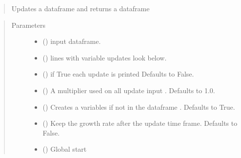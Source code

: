 \documentclass[letterpaper,10pt,english]{sphinxmanual}
\begin{document}
\begin{fulllineitems}
\begin{fulllineitems}
\begin{quote}
\sphinxAtStartPar
Updates a dataframe and returns a dataframe
\end{quote}
\begin{quote}\begin{description}
\item[{Parameters}] \leavevmode\begin{itemize}
\item {} 
\sphinxAtStartPar
{} () \textendash{} input dataframe.

\item {} 
\sphinxAtStartPar
{} () \textendash{} lines with variable updates look below.

\item {} 
\sphinxAtStartPar
{} (\sphinxstyleliteralemphasis{\sphinxupquote{, }}) \textendash{} if True each update is printed  Defaults to False.

\item {} 
\sphinxAtStartPar
{} (\sphinxstyleliteralemphasis{\sphinxupquote{, }}) \textendash{} A multiplier used on all update input . Defaults to 1.0.

\item {} 
\sphinxAtStartPar
{} (\sphinxstyleliteralemphasis{\sphinxupquote{, }}) \textendash{} Creates a variables if not in the dataframe . Defaults to True.

\item {} 
\sphinxAtStartPar
{} (\sphinxstyleliteralemphasis{\sphinxupquote{, }}) \textendash{} Keep the growth rate after the update time frame. Defaults to False.

\item {} 
\sphinxAtStartPar
{} (\sphinxstyleliteralemphasis{\sphinxupquote{, }}) \textendash{} Global start


\end{itemize}
\end{description}
\end{quote}
\end{fulllineitems}
\end{fulllineitems}
\end{document}
